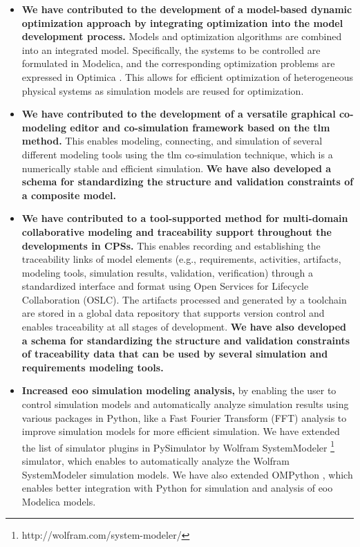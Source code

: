\begin{itemize}
	
\item \textbf{We have contributed to the development of a model-based dynamic optimization approach by integrating optimization into the model development process.} Models and optimization algorithms are combined into an integrated model. Specifically, the systems to be controlled are formulated in Modelica, and the corresponding optimization problems are expressed in Optimica \cite{optimica}. This allows for efficient optimization of heterogeneous physical systems as simulation models are reused for optimization.

\item \textbf{We have contributed to the development of a versatile graphical co-modeling editor and co-simulation framework based on the \acrshort{tlm} method.} This enables modeling, connecting, and simulation of several different modeling tools using the \acrshort{tlm} co-simulation technique, which is a numerically stable and efficient simulation. \textbf{We have also developed a schema for standardizing the structure and validation constraints of a composite model.} 

\item \textbf{We have contributed to a tool-supported method for multi-domain collaborative modeling and traceability support throughout the developments in CPSs.} This enables recording and establishing the traceability links of model elements (e.g., requirements, activities, artifacts, modeling tools, simulation results, validation, verification) through a standardized interface and format using Open Services for Lifecycle Collaboration (OSLC). The artifacts processed and generated by a toolchain are stored in a global data repository that supports version control and enables traceability at all stages of development.\textbf{ We have also developed a schema for standardizing the structure and validation constraints of traceability data that can be used by several simulation and requirements modeling tools.} 

\item \textbf{Increased \acrshort{eoo} simulation modeling analysis,} by enabling the user to control simulation models and automatically analyze simulation results using various packages in Python, like a Fast Fourier Transform (FFT) analysis to improve simulation models for more efficient simulation. We have extended the list of simulator plugins in PySimulator \cite{pysimulator} by Wolfram SystemModeler \footnote{http://wolfram.com/system-modeler/} simulator, which enables to automatically analyze the Wolfram SystemModeler simulation models. We have also extended OMPython \cite{ompython}, which enables better integration with Python for simulation and analysis of \acrshort{eoo} Modelica models.

\end{itemize}


